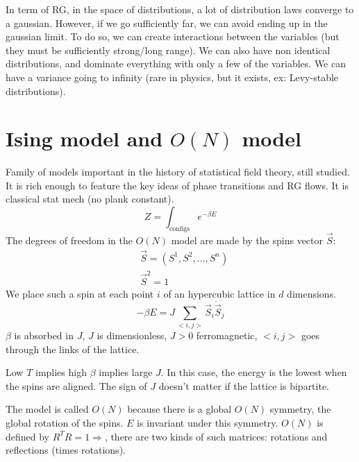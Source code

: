 \documentclass[a4paper]{book}
\theoremstyle{definition}
\theoremstyle{remark}
\begin{document}
In term of RG, in the space of distributions, a lot of distribution laws converge to a gaussian. However, if we go sufficiently far, we can avoid ending up in the gaussian limit. To do so, we can create interactions between the variables (but they must be sufficiently strong/long range). We can also have non identical distributions, and dominate everything with only a few of the variables. We can have a variance going to infinity (rare in physics, but it exists, ex: Levy-stable distributions). 

\section{Ising model and $O(N)$ model}

Family of models important in the history of statistical field theory, still studied. It is rich enough to feature the key ideas of phase transitions and RG flows. It is classical stat mech (no plank constant).
\begin{equation}
    Z = \int_{\text{configs}} e^{-\beta E}
\end{equation}
The degrees of freedom in the $O(N)$ model are made by the spins vector $\vec{S}$:
\begin{equation}
    \begin{aligned}
        &\vec{S} = (S^1, S^2, \dots, S^n) \\ 
        &\vec{S}^2 = 1
    \end{aligned}
\end{equation}
We place such a spin at each point $i$ of an hypercubic lattice in $d$ dimensions. 
\begin{equation}
    -\beta E = J\sum_{<i, j>} \vec{S}_i \dot \vec{S}_j
\end{equation}
$\beta$ is absorbed in $J$, $J$ is dimensionless, $J>0$ ferromagnetic, $<i, j>$ goes through the links of the lattice. \par \medskip

Low $T$ implies high $\beta$ implies large $J$. In this case, the energy is the lowest when the spins are aligned. The sign of $J$ doesn't matter if the lattice is bipartite.\par \medskip 

The model is called $O(N)$ because there is a global $O(N)$ symmetry, the global rotation of the spins. $E$ is invariant under this symmetry. $O(N)$ is defined by $R^TR = 1 \Rightarrow$, there are two kinds of such matrices: rotations and reflections (times rotations). \par \medskip 
\end{document}
